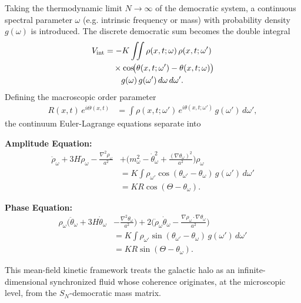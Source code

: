 Taking the thermodynamic limit $N\to\infty$ of the democratic system, a continuous spectral parameter $\omega$ (e.g. intrinsic frequency or mass) with probability density $g(\omega)$ is introduced. The discrete democratic sum becomes the double integral
\begin{equation}
\begin{aligned}
V_{\rm int} &= -K\iint
\rho(x,t;\omega)\,\rho(x,t;\omega') \\
&\quad\times\cos\!\bigl(\theta(x,t;\omega')-\theta(x,t;\omega)\bigr) \\
&\quad\quad g(\omega)\,g(\omega')\,d\omega\,d\omega' .
\end{aligned}
\end{equation}
Defining the macroscopic order parameter
\begin{equation}
\begin{aligned}
R(x,t)\,e^{i\Theta(x,t)}
&= \int \rho(x,t;\omega')\,e^{i\theta(x,t;\omega')}\,g(\omega')\,d\omega' ,
\end{aligned}
\end{equation}
the continuum Euler-Lagrange equations separate into

\textbf{Amplitude Equation:}
\begin{equation}
\begin{aligned}
\ddot{\rho}_\omega + 3H\dot{\rho}_\omega - \frac{\nabla^2\rho_\omega}{a^2}
&+ \Big(m_\omega^2 - \dot{\theta}_\omega^2 + \frac{(\nabla\theta_\omega)^2}{a^2}\Big)\rho_\omega \\
&= K\int \rho_{\omega'}\cos(\theta_{\omega'}-\theta_\omega)\,g(\omega')\,d\omega' \nonumber\\
&= K R\cos(\Theta-\theta_\omega) .
\end{aligned}
\end{equation}

\textbf{Phase Equation:}
\begin{equation}
\begin{aligned}
\rho_\omega\Big(\ddot{\theta}_\omega + 3H\dot{\theta}_\omega
&- \frac{\nabla^2\theta_\omega}{a^2}\Big)
+ 2\Big(\dot{\rho}_\omega\dot{\theta}_\omega - \frac{\nabla\rho_\omega\!\cdot\!\nabla\theta_\omega}{a^2}\Big) \\
&= K\int \rho_{\omega'}\sin(\theta_{\omega'}-\theta_\omega)\,g(\omega')\,d\omega' \\
&= K R\sin(\Theta-\theta_\omega) .
\end{aligned}
\end{equation}

This mean-field kinetic framework treats the galactic halo as an infinite-dimensional synchronized fluid whose coherence originates, at the microscopic level, from the $S_N$-democratic mass matrix.